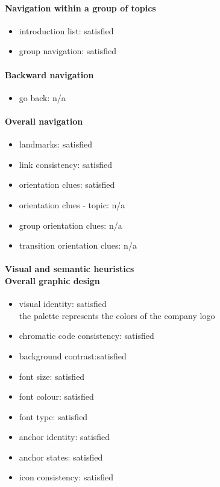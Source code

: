 \begin{enumerate}
	\paragraph*{Navigation within a group of topics}
	\begin{itemize}
		\item introduction list: satisfied
		\item group navigation: satisfied
	\end{itemize}
	
	\paragraph*{Backward navigation}
	\begin{itemize}
		\item go back: n/a
	\end{itemize}
	
	\paragraph*{Overall navigation}
	\begin{itemize}
		\item landmarks: satisfied
		\item link consistency: satisfied
		\item orientation clues: satisfied
		\item orientation clues - topic: n/a
		\item group orientation clues: n/a
		\item transition orientation clues: n/a
	\end{itemize}	
	
	\paragraph*{Visual and semantic heuristics \\ Overall graphic design }
	\begin{itemize}
		\item visual identity: satisfied\\
		the palette represents the colors of the company logo
		\item chromatic code consistency: satisfied
		\item background contrast:satisfied
		\item font size: satisfied
		\item font colour: satisfied
		\item font type: satisfied
		\item anchor identity: satisfied
		\item anchor states: satisfied
		\item icon consistency: satisfied
	\end{itemize}
	

\end{enumerate}
